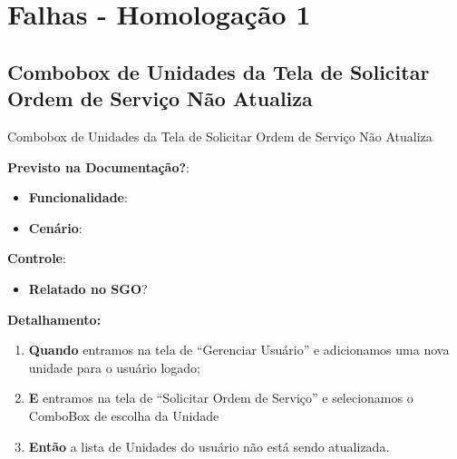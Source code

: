 \section{Falhas - Homologação 1}


\subsection{Combobox de Unidades da Tela de Solicitar Ordem de Serviço Não Atualiza}
\begin{falha}[1]{Combobox de Unidades da Tela de Solicitar Ordem de Serviço Não Atualiza}


\textbf{Previsto na Documentação?}: \mschecksim
\begin{itemize}
	\item \textbf{Funcionalidade}: \sosFu
	\item \textbf{Cenário}: \sosFuCu
\end{itemize}

\textbf{Controle}:
	\begin{itemize}
		\item \textbf{Relatado no SGO}? \mschecksim 
	\end{itemize}


\tcblower

\textbf{Detalhamento:}
\begin{enumerate}
	\item \textbf{Quando} entramos na tela de ``Gerenciar Usuário'' e adicionamos uma nova unidade para o usuário logado;

	\item \textbf{E} entramos na tela de ``Solicitar Ordem de Serviço'' e selecionamos o ComboBox de escolha da Unidade
	
	\item \textbf{Então} a lista de Unidades do usuário não está sendo atualizada.	
\end{enumerate}

\end{falha}

